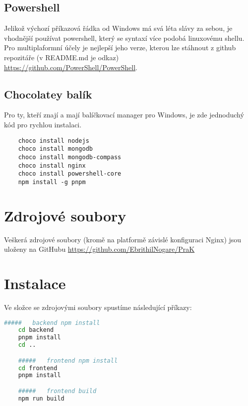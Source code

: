 \subsection{Powershell}
Jelikož výchozí příkazová řádka od Windows má svá léta slávy za sebou, je
vhodnější používat powershell, který se syntaxí více podobá linuxovému shellu.
Pro multiplaformní účely je nejlepší jeho  verze, kterou lze stáhnout
z github repozitáře (v README.md je odkaz) \url{https://github.com/PowerShell/PowerShell}.

\subsection{Chocolatey balík}
Pro ty, kteří znají a mají balíčkovací manager  pro Windows, je zde
jednoduchý kód pro rychlou instalaci.
\begin{lstlisting}
	choco install nodejs
	choco install mongodb
	choco install mongodb-compass
	choco install nginx
	choco install powershell-core
	npm install -g pnpm
\end{lstlisting}

\section{Zdrojové soubory}
Veškerá zdrojové soubory (kromě na platformě závislé konfiguraci Nginx)
jsou uloženy na GitHubu \url{https://github.com/EbrithilNogare/PraK}

\section{Instalace}
Ve složce se zdrojovými soubory spustíme následující příkazy:
\begin{lstlisting}[language=bash]
	#####   backend npm install
	cd backend
	pnpm install
	cd ..

	#####   frontend npm install
	cd frontend
	pnpm install

	#####   frontend build
	npm run build
\end{lstlisting}

